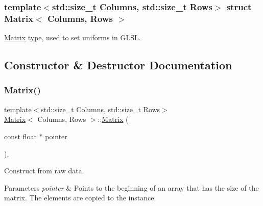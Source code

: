 \subsubsection*{template$<$std\+::size\+\_\+t Columns, std\+::size\+\_\+t Rows$>$\newline
struct Matrix$<$ Columns, Rows $>$}

\mbox{\hyperlink{struct_matrix}{Matrix}} type, used to set uniforms in G\+L\+SL. 

\begin{DoxyVerb}\end{DoxyVerb}
 

\subsection{Constructor \& Destructor Documentation}
\mbox{\label{struct_matrix_ad40da72f526bcd6854d83496d2f62e01}} 
\subsubsection{\texorpdfstring{Matrix()}{Matrix()}\hspace{0.1cm}{\footnotesize\ttfamily [1/2]}}
{\footnotesize\ttfamily template$<$std\+::size\+\_\+t Columns, std\+::size\+\_\+t Rows$>$ \\
\mbox{\hyperlink{struct_matrix}{Matrix}}$<$ Columns, Rows $>$\+::\mbox{\hyperlink{struct_matrix}{Matrix}} (\begin{DoxyParamCaption}\item[{const float $\ast$}]{pointer }\end{DoxyParamCaption})\hspace{0.3cm}{\ttfamily [inline]}, {\ttfamily [explicit]}}



Construct from raw data. 


\begin{DoxyParams}{Parameters}
{\em pointer} & Points to the beginning of an array that has the size of the matrix. The elements are copied to the instance. \begin{DoxyVerb}\end{DoxyVerb}
 \\
\hline
\end{DoxyParams}
\mbox{\label{struct_matrix_acc8ec3ddfe33a01f9ae7970d8fed9855}} 
